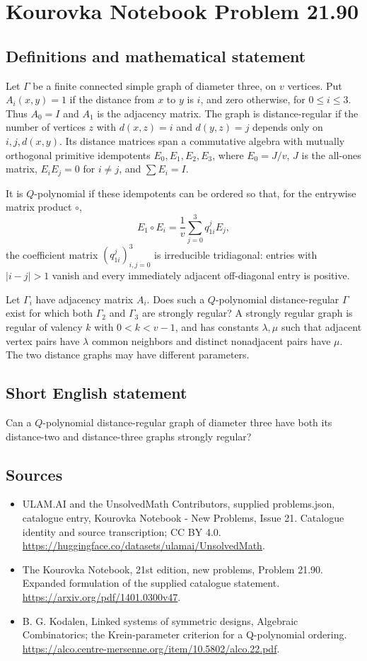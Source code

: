 \documentclass[11pt,a4paper]{article}
\begin{document}
\section*{Kourovka Notebook Problem 21.90}\label{statement}

\subsection{Definitions and mathematical statement}
Let $\Gamma$ be a finite connected simple graph of diameter three, on $v$
vertices. Put $A_i(x,y)=1$ if the distance from $x$ to $y$ is $i$, and zero
otherwise, for $0\leq i\leq3$. Thus $A_0=I$ and $A_1$ is the adjacency matrix.
The graph is distance-regular if the number of vertices $z$ with
$d(x,z)=i$ and $d(y,z)=j$ depends only on $i,j,d(x,y)$.
Its distance matrices span a commutative algebra with mutually orthogonal
primitive idempotents $E_0,E_1,E_2,E_3$, where $E_0=J/v$, $J$ is the all-ones
matrix, $E_iE_j=0$ for $i\ne j$, and $\sum E_i=I$.

It is $Q$-polynomial if these idempotents can be ordered so that, for the
entrywise matrix product $\circ$,
\[
E_1\circ E_i=\frac1v\sum_{j=0}^3 q_{1i}^{j}E_j,
\]
the coefficient matrix $(q_{1i}^{j})_{i,j=0}^3$ is irreducible tridiagonal:
entries with $|i-j|>1$ vanish and every immediately adjacent off-diagonal
entry is positive.

Let $\Gamma_i$ have adjacency matrix $A_i$. Does such a $Q$-polynomial
distance-regular $\Gamma$ exist for which both $\Gamma_2$ and $\Gamma_3$ are
strongly regular? A strongly regular graph is regular of valency $k$ with
$0<k<v-1$, and has constants $\lambda,\mu$ such that adjacent vertex pairs
have $\lambda$ common neighbors and distinct nonadjacent pairs have $\mu$.
The two distance graphs may have different parameters.
\subsection{Short English statement}
Can a $Q$-polynomial distance-regular graph of diameter three have both its distance-two and distance-three graphs strongly regular?
\subsection{Sources}
\begin{itemize}
\item[S1] ULAM.AI and the UnsolvedMath Contributors, supplied problems.json, catalogue entry, Kourovka Notebook - New Problems, Issue 21. Catalogue identity and source transcription; CC BY 4.0.
\url{https://huggingface.co/datasets/ulamai/UnsolvedMath}.
\item[S2] The Kourovka Notebook, 21st edition, new problems, Problem 21.90. Expanded formulation of the supplied catalogue statement.
\url{https://arxiv.org/pdf/1401.0300v47}.
\item[S3] B. G. Kodalen, Linked systems of symmetric designs, Algebraic Combinatorics; the Krein-parameter criterion for a Q-polynomial ordering.
\url{https://alco.centre-mersenne.org/item/10.5802/alco.22.pdf}.
\end{itemize}
\end{document}
